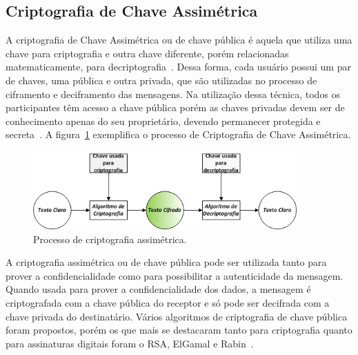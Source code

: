 \subsection{Criptografia de Chave Assimétrica}

A criptografia de Chave Assimétrica ou de chave pública é aquela que utiliza uma chave para criptografia e outra chave diferente, porém relacionadas matematicamente, para decriptografia~\cite{stallings2008}. Dessa forma, cada usuário possui um par de chaves, uma pública e outra privada, que são utilizadas no processo de ciframento e deciframento das mensagens. Na utilização dessa técnica, todos os participantes têm acesso a chave pública porém as chaves privadas devem ser de conhecimento apenas do seu proprietário, devendo permanecer protegida e secreta~\cite{stallings2008}. A figura~\ref{fig:criptografiaassimetrica} exemplifica o processo de Criptografia de Chave Assimétrica.

\begin{figure}[!htb]
\centering
\includegraphics[width=0.9\textwidth]{criptografiaassimetrica.png}
\caption{Processo de criptografia assimétrica.}
\label{fig:criptografiaassimetrica}
\end{figure}

A criptografia assimétrica ou de chave pública pode ser utilizada tanto para prover a confidencialidade como para possibilitar a autenticidade da mensagem. Quando usada para prover a confidencialidade dos dados, a mensagem é criptografada com a chave pública do receptor e só pode ser decifrada com a chave privada do destinatário. Vários algoritmos de criptografia de chave pública foram propostos, porém os que mais se destacaram  tanto para  criptografia quanto para assinaturas digitais foram o RSA, ElGamal e Rabin~\cite{Schneier1995}.

